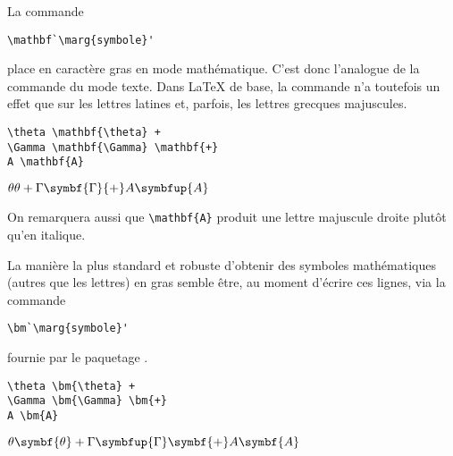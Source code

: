 La commande
\begin{lstlisting}
\mathbf`\marg{symbole}'
\end{lstlisting}
place  en caractère gras en mode mathématique. C'est
donc l'analogue de la commande \cmd{\textbf} du mode texte. Dans
{\LaTeX} de base, la commande n'a toutefois un effet que sur les
lettres latines et, parfois, les lettres grecques majuscules.
\begin{demo}
  \begin{texample}[0.6\linewidth]
\begin{lstlisting}
\theta \mathbf{\theta} +
\Gamma \mathbf{\Gamma} \mathbf{+}
A \mathbf{A}
\end{lstlisting}
    \producing
    $\theta {\theta} + \Gamma \symbf{\Gamma} {+} A \symbfup{A}$
  \end{texample}
\end{demo}
On remarquera aussi que \verb=\mathbf{A}= produit une lettre
majuscule droite plutôt qu'en italique.

La manière la plus standard et robuste d'obtenir des symboles
mathématiques (autres que les lettres) en gras semble être, au moment
d'écrire ces lignes, via la commande
\begin{lstlisting}
\bm`\marg{symbole}'
\end{lstlisting}
fournie par le paquetage  \citep{bm}.
\begin{demo}
  \begin{texample}[0.6\linewidth]
\begin{lstlisting}
\theta \bm{\theta} +
\Gamma \bm{\Gamma} \bm{+}
A \bm{A}
\end{lstlisting}
    \producing
    $\theta \symbf{\theta} + \Gamma \symbfup{\Gamma} \symbf{+} A
    \symbf{A}$
  \end{texample}
\end{demo}

